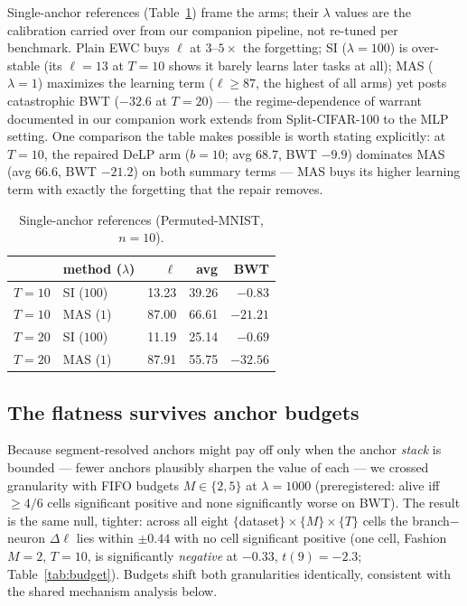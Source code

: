 \documentclass[review,12pt,number]{elsarticle}
\begin{document}
Single-anchor references (Table~\ref{tab:refs}) frame the arms; their
$\lambda$ values are the calibration carried over from our companion
pipeline, not re-tuned per benchmark. Plain EWC buys $\ell$ at
$3$--$5\times$ the forgetting; SI ($\lambda{=}100$) is over-stable (its
$\ell{=}13$ at $T{=}10$ shows it barely learns later tasks at all); MAS
($\lambda{=}1$) maximizes the learning term ($\ell \ge 87$, the highest
of all arms) yet posts catastrophic BWT ($-32.6$ at $T{=}20$) --- the
regime-dependence of warrant documented in our companion work extends
from Split-CIFAR-100 to the MLP setting. One comparison the table makes
possible is worth stating explicitly: at $T{=}10$, the repaired
\mbox{DeLP} arm ($b{=}10$; avg $68.7$, BWT $-9.9$) dominates MAS (avg
$66.6$, BWT $-21.2$) on both summary terms --- MAS buys its higher
learning term with exactly the forgetting that the repair removes.

\begin{table}[t]
\centering\small
\caption{Single-anchor references (Permuted-MNIST, $n{=}10$).}
\label{tab:refs}
\begin{tabular}{llrrr}
\toprule
 & method ($\lambda$) & $\ell$ & avg & BWT \\
\midrule
$T{=}10$ & SI ($100$) & 13.23 & 39.26 & $-0.83$ \\
$T{=}10$ & MAS ($1$)   & 87.00 & 66.61 & $-21.21$ \\
$T{=}20$ & SI ($100$) & 11.19 & 25.14 & $-0.69$ \\
$T{=}20$ & MAS ($1$)   & 87.91 & 55.75 & $-32.56$ \\
\bottomrule
\end{tabular}
\end{table}

\subsection{The flatness survives anchor budgets}
\label{sec:budget}

Because segment-resolved anchors might pay off only when the anchor
\emph{stack} is bounded --- fewer anchors plausibly sharpen the value of
each --- we crossed granularity with FIFO budgets $M \in \{2, 5\}$ at
$\lambda{=}1000$ (preregistered: alive iff $\ge 4/6$ cells significant
positive and none significantly worse on BWT). The result is the same null,
tighter: across all eight $\{$dataset$\}\times\{M\}\times\{T\}$ cells the
branch$-$neuron $\Delta\ell$ lies within $\pm 0.44$ with no cell significant
positive (one cell, Fashion $M{=}2$, $T{=}10$, is significantly
\emph{negative} at $-0.33$, $t(9){=}-2.3$; Table~\ref{tab:budget}).
Budgets shift both granularities identically, consistent with the shared
mechanism analysis below.
\end{document}
